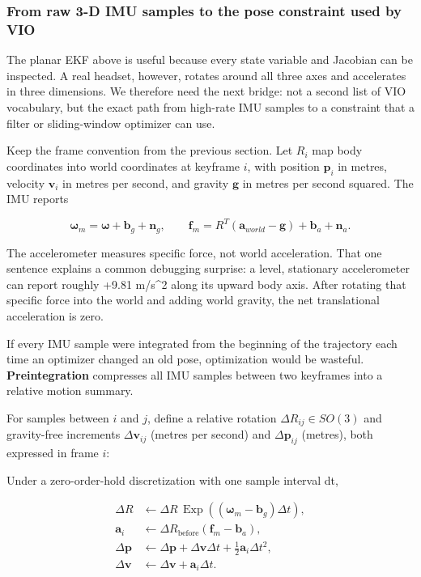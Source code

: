 \subsubsection{From raw 3-D IMU samples to the pose constraint used by VIO}\label{04-visual-computing-ii-ch035-from-raw-3-d-imu-samples-to-the-pose-constraint-used-by-vio}

The planar EKF above is useful because every state variable and Jacobian can be inspected. A real headset, however, rotates around all three axes and accelerates in three dimensions. We therefore need the next bridge: not a second list of VIO vocabulary, but the exact path from high-rate IMU samples to a constraint that a filter or sliding-window optimizer can use.

Keep the frame convention from the previous section. Let \(R_i\) map body coordinates into world coordinates at keyframe \(i\), with position \(\mathbf p_i\) in metres, velocity \(\mathbf v_i\) in metres per second, and gravity \(\mathbf g\) in metres per second squared. The IMU reports

\[
\boldsymbol\omega_m=\boldsymbol\omega+\mathbf b_g+\mathbf n_g,
\qquad
\mathbf f_m=R^T(\mathbf a_{world}-\mathbf g)+\mathbf b_a+\mathbf n_a.
\]

The accelerometer measures specific force, not world acceleration. That one sentence explains a common debugging surprise: a level, stationary accelerometer can report roughly +9.81 m/s\^{}2 along its upward body axis. After rotating that specific force into the world and adding world gravity, the net translational acceleration is zero.

If every IMU sample were integrated from the beginning of the trajectory each time an optimizer changed an old pose, optimization would be wasteful. \textbf{Preintegration} compresses all IMU samples between two keyframes into a relative motion summary.

For samples between \(i\) and \(j\), define a relative rotation \(\Delta R_{ij}\in SO(3)\) and gravity-free increments \(\Delta\mathbf v_{ij}\) (metres per second) and \(\Delta\mathbf p_{ij}\) (metres), both expressed in frame \(i\):

Under a zero-order-hold discretization with one sample interval dt,

\[
\begin{aligned}
\Delta R &\leftarrow \Delta R\,\operatorname{Exp}((\boldsymbol\omega_m-\mathbf b_g)\Delta t),\\
\mathbf a_i &\leftarrow \Delta R_{\mathrm{before}}(\mathbf f_m-\mathbf b_a),\\
\Delta\mathbf p &\leftarrow \Delta\mathbf p+\Delta\mathbf v\Delta t+\tfrac12\mathbf a_i\Delta t^2,\\
\Delta\mathbf v &\leftarrow \Delta\mathbf v+\mathbf a_i\Delta t.
\end{aligned}
\]

